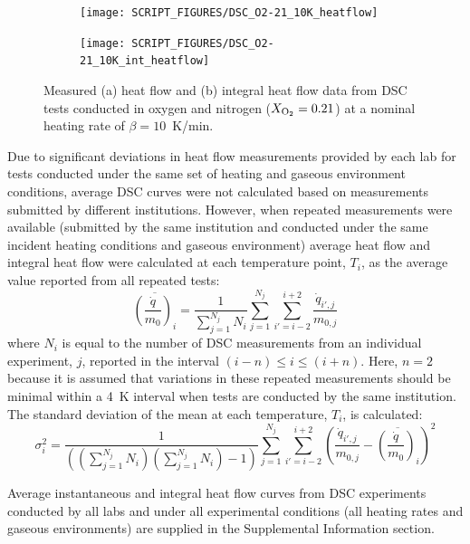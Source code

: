 \documentclass{book}
\begin{document}
\begin{figure}[p]
\centering
\begin{subfigure}[b]{0.85\textwidth}
   \texttt{[image: SCRIPT\_FIGURES/DSC\_O2-21\_10K\_heatflow]}
   \caption{}
   \label{Fig:DSC_O2-21_10K_heatflow}
\end{subfigure}

\begin{subfigure}[b]{0.85\textwidth}
   \texttt{[image: SCRIPT\_FIGURES/DSC\_O2-21\_10K\_int\_heatflow]}
   \caption{}
   \label{Fig:DSC_O2-21_10K_int_heatflow}
\end{subfigure}

  \caption{Measured (a) heat flow and (b) integral heat flow data from DSC tests conducted in oxygen and nitrogen ($X_{\rm O_2}=0.21$) at a nominal heating rate of $\beta=10$~K/min.}
  \label{Fig:DSC_O2-21_10K}
\end{figure}

\newpage
Due to significant deviations  in heat flow measurements provided by each lab for tests conducted under the same set of heating and gaseous environment conditions, average DSC curves were not calculated based on measurements submitted by different institutions. However, when repeated measurements were available (submitted by the same institution and conducted under the same incident heating conditions and gaseous environment) average heat flow and integral heat flow were calculated at each temperature point, $T_i$, as the average value reported from all repeated tests:
\begin{equation}
   \overline{ \left( \frac{\dot{q}}{m_0} \right)_i } = \frac{1}{\sum_{j=1}^{N_j}{N_i}} \sum_{j=1}^{N_j} \sum_{i'=i-2}^{i+2} \frac{\dot{q}_{i',j}}{m_{0,j}}
\end{equation}
where $N_i$ is equal to the number of DSC measurements from an individual experiment, $j$, reported in the interval $(i-n) \leq i \leq (i+n)$. Here, $n=2$ because it is assumed that variations in these repeated measurements should be minimal within a 4~K interval when tests are conducted by the same institution. The standard deviation of the mean at each temperature, $T_i$, is calculated:
\begin{equation}
   \sigma_i^2 = \frac{1}{(({\sum_{j=1}^{N_j}{N_i}})({\sum_{j=1}^{N_j}{N_i}})-1)} \sum_{j=1}^{N_j} \sum_{i'=i-2}^{i+2} \left( \frac{\dot{q}_{i',j}}{m_{0,j}} - \overline{ \left( \frac{\dot{q}}{m_0} \right)_i }   \right)^2
\end{equation}


Average instantaneous and integral heat flow curves from DSC experiments conducted by all labs and under all experimental conditions (all heating rates and gaseous environments) are supplied in the Supplemental Information section.
\end{document}
